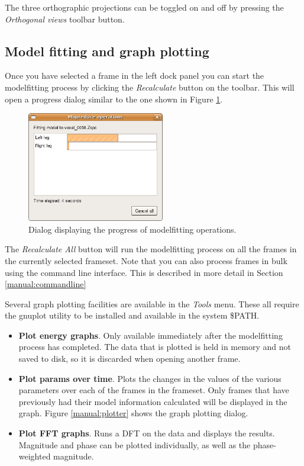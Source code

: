 The three orthographic projections can be toggled on and off by pressing the \emph{Orthogonal views} toolbar button.


\subsection{Model fitting and graph plotting}

Once you have selected a frame in the left dock panel you can start the modelfitting process by clicking the \emph{Recalculate} button on the toolbar.
This will open a progress dialog similar to the one shown in Figure \ref{manual:modelfitting}.

\begin{figure}[htb]
	\centering
	\includegraphics[width=6cm]{manual/modelfitting.png}
	\caption{Dialog displaying the progress of modelfitting operations.}
	\label{manual:modelfitting}
\end{figure}

The \emph{Recalculate All} button will run the modelfitting process on all the frames in the currently selected frameset.
Note that you can also process frames in bulk using the command line interface.
This is described in more detail in Section \ref{manual:commandline}

\bigskip
\noindent Several graph plotting facilities are available in the \emph{Tools} menu.
These all require the gnuplot utility to be installed and available in the system \$PATH.

\begin{itemize}
	\item \textbf{Plot energy graphs}.
		Only available immediately after the modelfitting process has completed.
		The data that is plotted is held in memory and not saved to disk, so it is discarded when opening another frame.
	\item \textbf{Plot params over time}.
		Plots the changes in the values of the various parameters over each of the frames in the frameset.
		Only frames that have previously had their model information calculated will be displayed in the graph.
		Figure \ref{manual:plotter} shows the graph plotting dialog.
	\item \textbf{Plot FFT graphs}.
		Runs a DFT on the data and displays the results.
		Magnitude and phase can be plotted individually, as well as the phase-weighted magnitude.
\end{itemize}

